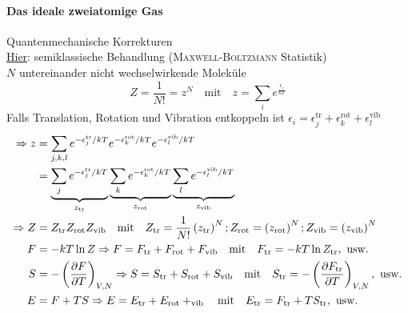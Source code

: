 \paragraph{Das ideale zweiatomige Gas} Quantenmechanische Korrekturen \\
\underline{Hier}: semiklassische Behandlung (\textsc{Maxwell-Boltzmann} Statistik) \\
$N$ untereinander nicht wechselwirkende Moleküle
\begin{equation}
    Z = \frac{1}{N!} = z^N \quad \text{mit} \quad z = \sum_i e^{\frac{\epsilon_i}{k T}}    %
\end{equation}
Falls Translation, Rotation und Vibration entkoppeln ist $\epsilon_i = \epsilon_j^\text{tr} + \epsilon_k^\text{rot} + \epsilon_l^\text{vib}$
\begin{equation}
    \begin{split}
        \Rightarrow z &= \sum_{j, k, l} e^{-\epsilon_j^\text{tr} / kT} e^{-\epsilon_k^\text{rot} / kT} e^{-\epsilon_l^\text{vib} / kT} \\
        &= \underbrace{\sum_j e^{-\epsilon_j^\text{tr} / kT}}_{z_\text{tr}} \underbrace{\sum_k e^{-\epsilon_k^\text{rot} / kT}}_{z_\text{rot}} \underbrace{\sum_l e^{-\epsilon_l^\text{vib} / kT}}_{z_\text{vib}} \\
        \Rightarrow Z &= Z_\text{tr} Z_\text{rot} Z_\text{vib} \quad \text{mit} \quad Z_\text{tr} = \frac{1}{N!} \left( z_\text{tr} \right)^N; Z_\text{rot} = \left( z_\text{rot} \right)^N; Z_\text{vib} = \left( z_\text{vib} \right)^N \\
        F &= - k T \ln Z \Rightarrow F = F_\text{tr} + F_\text{rot} + F_\text{vib} \quad \text{mit} \quad F_\text{tr} = - k T \ln Z_\text{tr}, \text{ usw.} \\
        S &= - \left( \frac{\partial F}{\partial T} \right)_{V, N} \Rightarrow S = S_\text{tr} + S_\text{rot} + S_\text{vib} \quad \text{mit} \quad S_\text{tr} = - \left( \frac{\partial F_\text{tr}}{\partial T} \right)_{V, N}, \text{ usw.} \\
        E &= F + T S \Rightarrow E = E_\text{tr} + E_\text{rot} + _\text{vib} \quad \text{mit} \quad E_\text{tr} = F_\text{tr} + T S_\text{tr}, \text{ usw.}
    \end{split}
\end{equation}
